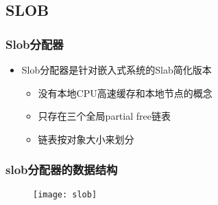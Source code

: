 \subsection{SLOB} %
\begin{frame}[plain,t]    
    \frametitle{Slob分配器}
    \begin{itemize}
        \item Slob分配器是针对嵌入式系统的Slab简化版本
        \begin{itemize}
            \item 没有本地CPU高速缓存和本地节点的概念
            \item 只存在三个全局partial free链表
            \item 链表按对象大小来划分
        \end{itemize}
    \end{itemize}
\end{frame}
\begin{frame}[plain,t]    
    \frametitle{slob分配器的数据结构}
    \begin{figure}
        \centering
        \texttt{[image: slob]}
    \end{figure}

\end{frame}
